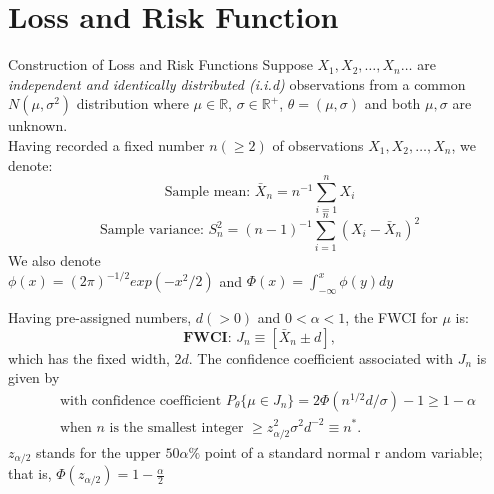 \documentclass [xcolor=svgnames, t] {beamer}
\begin{document}


\section{Loss and Risk Function}
\begin{frame}{Construction of Loss and Risk Functions}
    Suppose $X_1,X_2, \dots ,X_n \dots$ are \textit{independent 
    and identically distributed (i.i.d)} observations from a common 
    $N(\mu,\sigma^2)$ distribution where $\mu \in \mathbb{R}$, 
    $\sigma \in \mathbb{R}^{+}$, $\theta=(\mu,\sigma)$ and both $\mu,\sigma$ are unknown. \\
    \vspace{2mm}
    Having recorded a fixed number $n (\geq 2)$ of observations $X_1,X_2,\dots,X_n$, we denote:
    $$\text{Sample mean: }\bar{X}_n=n^{-1}\sum_{i=1}^nX_i$$
    $$\text{Sample variance: }S_n^2=(n-1)^{-1}\sum_
    {i=1}^n {(X_i-\bar{X}_n)^2}$$
    \vspace{0.1cm}
    We also denote \\
    $\phi(x)=(2\pi)^{-1/2}exp(-x^2/2)$ and $\Phi(x) = \int_{-\infty}^{x} \phi(y) dy $
    
    \end{frame}

    
 \begin{frame}{}
    \vspace{7mm}

    
    Having pre-assigned numbers, $d(>0)$ and $0<\alpha<1$, the FWCI for $\mu$ is:
        $$\textbf{FWCI: } J_n \equiv \left[ \bar{X}_n \pm d\right],$$
        which  has the fixed width, $2d$. The confidence coefficient associated with $J_n$ is given by
        \begin{equation} \label{opt_n} 
        \begin{split}
        & \text{ with confidence coefficient }P_{\theta}\{\mu \in J_n\} = 2\Phi(n^{1/2}d/\sigma)-1  \ge 1-\alpha \\
        & \text{ when } n \text{ is the smallest integer } \ge z^2_{\alpha/2}\sigma^2 d^{-2} \equiv n^*.
        \end{split}
        \end{equation}
        $z_{\alpha/2}$ stands for the upper $50 \alpha \%$ point of a standard normal r
        andom variable; that is, $\Phi(z_{\alpha/2})=1-\frac{\alpha}{2}$

\end{frame}
\end{document}
